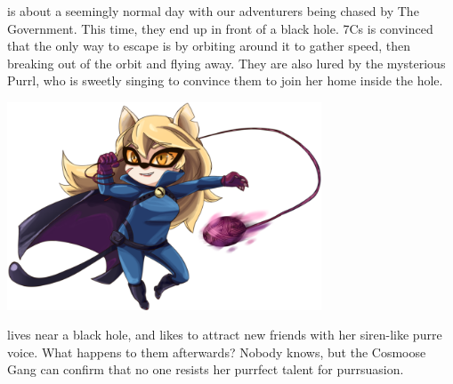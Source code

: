 

 is about a seemingly normal day with our adventurers being chased by The Government. This time, they end up in front of a black hole. 7Cs is convinced that the only way to escape is by orbiting around it to gather speed, then breaking out of the orbit and flying away. They are also lured by the mysterious Purrl, who is sweetly singing to convince them to join her home inside the hole.\\

\begin{center}
\includegraphics[width=0.7\textwidth]{Assets/purrl}
\end{center}

 lives near a black hole, and likes to attract new friends with her siren-like purre voice. What happens to them afterwards? Nobody knows, but the Cosmoose Gang can confirm that no one resists her purrfect talent for purrsuasion. \\

\clearpage